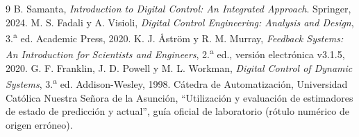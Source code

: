 \begin{thebibliography}{9}
 B. Samanta, \emph{Introduction to Digital Control: An Integrated Approach}. Springer, 2024.
 M. S. Fadali y A. Visioli, \emph{Digital Control Engineering: Analysis and Design}, 3.\textsuperscript{a} ed. Academic Press, 2020.
 K. J. Åstr\"om y R. M. Murray, \emph{Feedback Systems: An Introduction for Scientists and Engineers}, 2.\textsuperscript{a} ed., versión electrónica v3.1.5, 2020.
 G. F. Franklin, J. D. Powell y M. L. Workman, \emph{Digital Control of Dynamic Systems}, 3.\textsuperscript{a} ed. Addison-Wesley, 1998.
 Cátedra de Automatización, Universidad Católica Nuestra Señora de la Asunción, ``Utilización y evaluación de estimadores de estado de predicción y actual'', guía oficial de laboratorio (rótulo numérico de origen erróneo).
\end{thebibliography}
